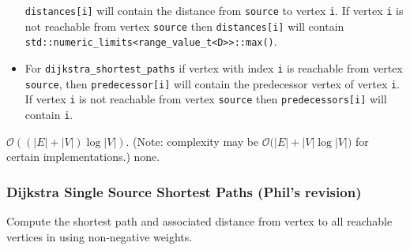 \begin{itemdescr}
\begin{itemize}
                        \lstinline{distances[i]} will contain the distance from \lstinline{source} to vertex
                        \lstinline{i}.  If vertex \lstinline{i} is not reachable from vertex
                        \lstinline{source} then \lstinline{distances[i]} will contain
                        \lstinline{std::numeric_limits<range_value_t<D>>::max()}.
                  \item
                        For \lstinline{dijkstra_shortest_paths} if vertex with index \lstinline{i} is reachable
                        from vertex \lstinline{source}, then \lstinline{predecessor[i]} will contain the
                        predecessor vertex of vertex \lstinline{i}.  If vertex \lstinline{i} is not reachable
                        from vertex \lstinline{source} then \lstinline{predecessors[i]} will contain
                        \lstinline{i}.
            \end{itemize}
      \pnum\complexity $\mathcal{O}((|E| + |V|)\log{|V|})$.  (Note: complexity may be
            $\mathcal{O}(|E| + |V|\log{|V|)}$ for certain implementations.)
      \pnum\throws none. 
\end{itemdescr}

\subsubsection{Dijkstra Single Source Shortest Paths (Phil's revision)}

\begin{comment}
\phil{Changes from previous: add description at beginning, add summary table of characteristics, remove shortest\_distances functions, 
update source to reflect discussions with Andrew and current implementation, use longer names in source for clarity, simplified wording 
of prerequisits and requires and returns sections.} \\
\phil{Also simplified the definitions by replacing \tcode{adjacency_list} with 
\tcode{index_adjacency_list}, expanded the defintion of \tcode{edge_value_function} and added a new \tcode{basic_edge_value_function} 
for the general definition. }
\end{comment}

Compute the shortest path and associated distance from vertex  to all reachable vertices in 
using non-negative weights.

